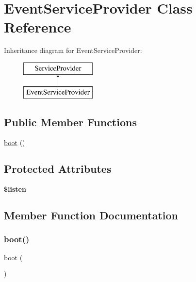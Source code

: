 \hypertarget{class_app_1_1_providers_1_1_event_service_provider}{}\section{Event\+Service\+Provider Class Reference}
\label{class_app_1_1_providers_1_1_event_service_provider}
Inheritance diagram for Event\+Service\+Provider\+:\begin{figure}[H]
\begin{center}
\leavevmode
\includegraphics[height=2.000000cm]{class_app_1_1_providers_1_1_event_service_provider}
\end{center}
\end{figure}
\subsection*{Public Member Functions}
\begin{DoxyCompactItemize}
\item 
\mbox{\hyperlink{class_app_1_1_providers_1_1_event_service_provider_a8814ea4b5beba763c570b4818980814e}{boot}} ()
\end{DoxyCompactItemize}
\subsection*{Protected Attributes}
\begin{DoxyCompactItemize}
\item 
{\bfseries \$listen}
\end{DoxyCompactItemize}


\subsection{Member Function Documentation}
\mbox{\label{class_app_1_1_providers_1_1_event_service_provider_a8814ea4b5beba763c570b4818980814e}} 
\subsubsection{\texorpdfstring{boot()}{boot()}}
{\footnotesize\ttfamily boot (\begin{DoxyParamCaption}{ }\end{DoxyParamCaption})}

